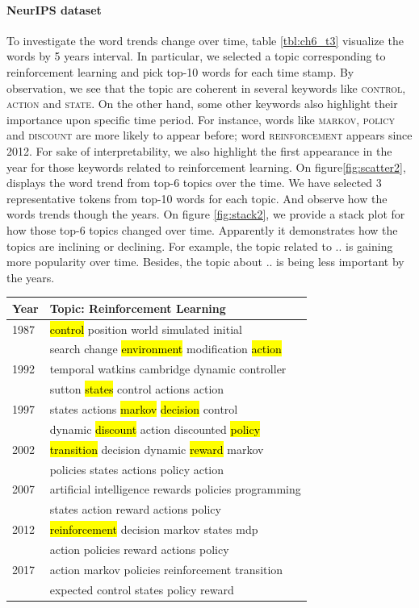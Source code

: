\paragraph{NeurIPS dataset} %
To investigate the word trends change over time, table \ref{tbl:ch6_t3} visualize the words by 5 years interval. In particular, we selected a topic corresponding to reinforcement learning and pick top-10 words for each time stamp. By observation, we see that the topic are coherent in several keywords like \textsc{control}, \textsc{action} and \textsc{state}. On the other hand, some other keywords also highlight their importance upon specific time period. For instance, words like \textsc{markov}, \textsc{policy} and \textsc{discount} are more likely to appear before; word \textsc{reinforcement} appears since 2012. For sake of interpretability, we also highlight the first appearance in the year for those keywords related to reinforcement learning.
On figure\ref{fig:scatter2}, displays the word trend from top-6 topics over the time. We have selected 3 representative tokens from top-10 words for each topic. And observe how the words trends though the years. 
On figure \ref{fig:stack2}, we provide a stack plot for how those top-6 topics changed over time. Apparently it demonstrates how the topics are inclining or declining. For example, the topic related to .. is gaining more popularity over time. Besides, the topic about .. is being less important by the years.
\begin{table}[h]
\centering
\begin{tabular}{ll}
\hline
Year&Topic: Reinforcement Learning\\ \hline
1987 &\hl{control} position world simulated initial \\
&search change \hl{environment} modification \hl{action}\\
1992 &temporal watkins cambridge dynamic controller \\
&sutton \hl{states} control actions action\\
1997 &states actions \hl{markov} \hl{decision} control \\
&dynamic \hl{discount} action discounted \hl{policy}\\
2002 &\hl{transition} decision dynamic \hl{reward} markov \\
&policies states actions policy action\\
2007 &artiﬁcial intelligence rewards policies programming \\
&states action reward actions policy\\
2012 &\hl{reinforcement} decision markov states mdp \\
&action policies reward actions policy\\
2017 &action markov policies reinforcement transition \\
&expected control states policy reward\\
\hline
\end{tabular}
\end{table}
